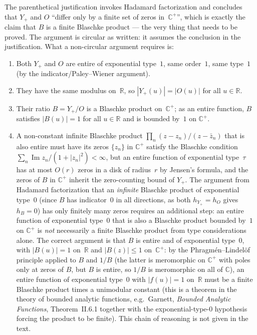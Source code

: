 \documentclass[11pt]{article}
\newcommand{\R}{\mathbb{R}}
\newcommand{\C}{\mathbb{C}}
\begin{document}
\begin{description}[leftmargin=0pt]
\item[What is relied on but not established in the text:]
The parenthetical justification invokes Hadamard factorization and concludes that
$Y_+$ and $O$ ``differ only by a finite set of zeros in~$\C^+$'', which is
exactly the claim that $B$ is a finite Blaschke product --- the very thing that
needs to be proved.
The argument is circular as written: it assumes the conclusion in the justification.
What a non-circular argument requires is:
\begin{enumerate}
\item Both $Y_+$ and $O$ are entire of exponential type~$1$, same order~$1$,
same type~$1$ (by the indicator/Paley--Wiener argument).
\item They have the same modulus on~$\R$, so $|Y_+(u)|=|O(u)|$ for all $u\in\R$.
\item Their ratio $B=Y_+/O$ is a Blaschke product on~$\C^+$; as an entire function,
$B$ satisfies $|B(u)|=1$ for all $u\in\R$ and is bounded by~$1$ on $\C^+$.
\item A non-constant infinite Blaschke product $\prod_n(z-z_n)/(z-\bar z_n)$
that is also entire must have its zeros $\{z_n\}$ in $\C^+$ satisfy the Blaschke
condition $\sum_n\operatorname{Im}z_n/(1+|z_n|^2)<\infty$, but an entire function
of exponential type~$\tau$ has at most $O(r)$ zeros in a disk of radius~$r$ by
Jensen's formula, and the zeros of $B$ in $\C^+$ inherit the zero-counting bound
of $Y_+$.
The argument from Hadamard factorization that an \emph{infinite} Blaschke product
of exponential type~$0$ (since $B$ has indicator~$0$ in all directions, as both
$h_{Y_+}=h_O$ gives $h_B=0$) has only finitely many zeros requires an additional
step: an entire function of exponential type~$0$ that is also a Blaschke product
bounded by~$1$ on $\C^+$ is \emph{not} necessarily a finite Blaschke product
from type considerations alone.
The correct argument is that $B$ is entire and of exponential type~$0$, with
$|B(u)|=1$ on~$\R$ and $|B(z)|\le 1$ on~$\C^+$: by the Phragm\'{e}n--Lindel\"{o}f
principle applied to $B$ and $1/B$ (the latter is meromorphic on $\C^+$ with
poles only at zeros of $B$, but $B$ is entire, so $1/B$ is meromorphic on all of
$\C$), an entire function of exponential type~$0$ with $|f(u)|=1$ on~$\R$ must be
a finite Blaschke product times a unimodular constant (this is a theorem in the
theory of bounded analytic functions, e.g.\ Garnett, \emph{Bounded Analytic
Functions}, Theorem~II.6.1 together with the exponential-type-$0$ hypothesis
forcing the product to be finite).
This chain of reasoning is not given in the text.
\end{enumerate}


\end{description}
\end{document}

